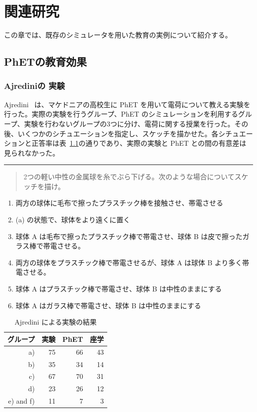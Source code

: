 \chapter{関連研究} \label{related}

この章では、既存のシミュレータを用いた教育の実例について紹介する。

\section{PhETの教育効果}


\subsection*{Ajrediniの 実験} \label{ajredini}

Ajredini~\cite{ajredini_real_2014} は、マケドニアの高校生に PhET を用いて電荷について教える実験を行った。実際の実験を行うグループ、PhET のシミュレーションを利用するグループ、実験を行わないグループの3つに分け、電荷に関する授業を行った。その後、いくつかのシチュエーションを指定し、スケッチを描かせた。各シチュエーションと正答率は表~\ref{ajredini_result}の通りであり、実際の実験と PhET との間の有意差は見られなかった。

\begin{table}[htb]
\noindent\rule{\linewidth}{0.4pt}
\begin{quote}
2つの軽い中性の金属球を糸でぶら下げる。次のような場合についてスケッチを描け。
\end{quote}
\begin{enumerate}
\renewcommand{\labelenumi}{\alph{enumi}).}
\item 両方の球体に毛布で擦ったプラスチック棒を接触させ、帯電させる
\item (a) の状態で、球体をより遠くに置く
\item 球体 A は毛布で擦ったプラスチック棒で帯電させ、球体 B は皮で擦ったガラス棒で帯電させる。
\item 両方の球体をプラスチック棒で帯電させるが、球体 A は球体 B より多く帯電させる。
\item 球体 A はプラスチック棒で帯電させ、球体 B は中性のままにする
\item 球体 A はガラス棒で帯電させ、球体 B は中性のままにする
\end{enumerate}
\centering
\begin{tabular}{rrrr}
  \toprule
  グループ & 実験 & PhET & 座学 \\
  \midrule
  a) & 75 & 66 & 43 \\
  b) & 35 & 34 & 14 \\
  c) & 67 & 70 & 31 \\
  d) & 23 & 26 & 12 \\
  e) and f) & 11 & 7 & 3 \\
  \bottomrule
\end{tabular}
\caption{Ajredini による実験の結果} \label{ajredini_result}
\end{table}

